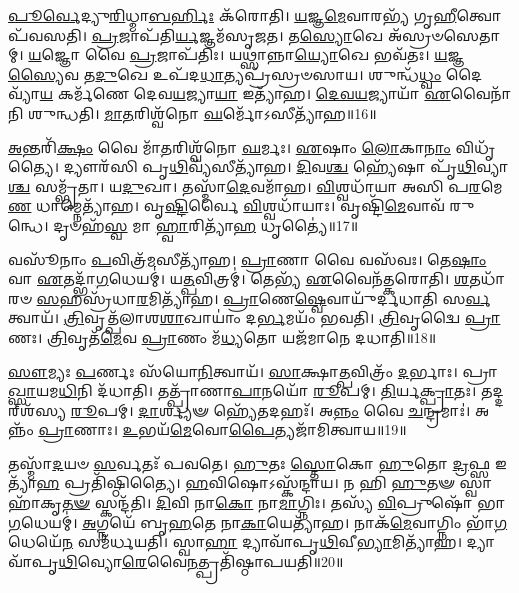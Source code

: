 \-\ul{𑌪𑍂}\-\-\ul{𑌰𑍍𑌵𑍇}\-𑌦𑍍𑌯𑍁\-\ul{𑌰𑌿}\-𑌧𑍍𑌮𑌾\-\ul{𑌬}\-\-\ul{𑌰𑍍}\-𑌹𑌿𑌃 𑌕᳴𑌰𑍋𑌤𑌿।
\-\ul{𑌯}\-𑌜𑍍𑌞\-\ul{𑌮𑍇}\-𑌵𑌾𑌰𑌭𑍍𑌯᳴ 𑌗𑍃\-\ul{𑌹𑍀}\-𑌤𑍍𑌵𑍋𑌪᳴𑌵𑌸𑌤𑌿।
\-\ul{𑌪𑍍𑌰}\-𑌜𑌾𑌪᳴𑌤𑌿\-\ul{𑌰𑍍𑌯}\-𑌜𑍍𑌞𑌮᳴\-𑌸𑍃𑌜𑌤।
𑌤\-\ul{𑌸𑍍𑌯𑍋}\-𑌖𑍇 𑌅᳴𑌸𑍍𑌰𑍞𑌸𑍇𑌤𑌾𑌮𑍍।
\-\ul{𑌯}\-𑌜𑍍𑌞𑍋 𑌵𑍈 \ul{𑌪𑍍𑌰}\-𑌜𑌾\-𑌪᳴𑌤𑌿𑌃।
𑌯𑌥𑍍𑌸𑌾॑𑌨𑍍𑌨𑌾\-\ul{𑌯𑍍𑌯𑍋}\-𑌖𑍇 𑌭𑌵᳴𑌤𑌃।
\-\ul{𑌯}\-𑌜𑍍𑌞\-\ul{𑌸𑍍𑌯𑍈}\-𑌵 𑌤\-\ul{𑌦𑍁}\-𑌖𑍇 𑌉𑌪᳴𑌦\-\ul{𑌧𑌾}\-𑌤𑍍𑌯𑌪𑍍𑌰᳴𑌸𑍍𑌰𑍞𑌸𑌾𑌯।
𑌶𑍁𑌨𑍍𑌧᳴\-\ul{𑌧𑍍𑌵𑌂} 𑌦𑍈𑌵𑍍𑌯𑌾᳴\-\ul{𑌯} 𑌕𑌰𑍍𑌮᳴𑌣𑍇 𑌦𑍇𑌵\-\ul{𑌯}\-𑌜𑍍𑌯𑌾\-\ul{𑌯𑌾} 𑌇𑌤𑍍𑌯𑌾᳴𑌹।
\-\ul{𑌦𑍇}\-\-\ul{𑌵}\-\-\ul{𑌯}\-𑌜𑍍𑌯𑌾𑌯𑌾᳴ \ul{𑌏}\-𑌵𑍈𑌨𑌾᳴𑌨𑌿 𑌶𑍁𑌨𑍍𑌧𑌤𑌿।
\-\ul{𑌮𑌾}\-\-\ul{𑌤}\-𑌰𑌿𑌶𑍍𑌵᳴𑌨𑍋 \ul{𑌘}\-𑌰𑍍𑌮𑍋᳴\-𑌽𑌸𑍀𑌤𑍍𑌯𑌾᳴𑌹॥16॥

\-\ul{𑌅}\-𑌨𑍍𑌤𑌰𑌿᳴\-\ul{𑌕𑍍𑌷𑌂} 𑌵𑍈 𑌮𑌾᳴\-\ul{𑌤}\-𑌰𑌿𑌶𑍍𑌵᳴𑌨𑍋 \ul{𑌘}\-𑌰𑍍𑌮𑌃।
\-\ul{𑌏}\-𑌷𑌾𑌂 \ul{𑌲𑍋}\-𑌕𑌾\-\ul{𑌨𑌾𑌂} 𑌵𑌿𑌧𑍃᳴𑌤𑍍𑌯𑍈।
𑌦𑍍𑌯𑍗𑌰᳴𑌸𑌿 𑌪𑍃\-\ul{𑌥𑌿}\-𑌵𑍍𑌯᳴𑌸𑍀𑌤𑍍𑌯𑌾᳴𑌹।
\-\ul{𑌦𑌿}\-𑌵\-\ul{𑌶𑍍𑌚} 𑌹𑍍𑌯𑍇᳴𑌷𑌾 𑌪𑍃᳴\-\ul{𑌥𑌿}\-𑌵𑍍𑌯𑌾\-\ul{𑌶𑍍𑌚} 𑌸𑌮𑍍𑌭𑍃᳴𑌤𑌾।
𑌯\-\ul{𑌦𑍁}\-𑌖𑌾।
𑌤𑌸𑍍𑌮𑌾᳴\-\ul{𑌦𑍇}\-𑌵𑌮𑌾᳴𑌹।
\-\ul{𑌵𑌿}\-𑌶𑍍𑌵𑌧𑌾᳴𑌯𑌾 𑌅𑌸𑌿 𑌪\-\ul{𑌰}\-𑌮𑍇\-\ul{𑌣} 𑌧𑌾𑌮𑍍𑌨𑍇𑌤𑍍𑌯𑌾᳴𑌹।
𑌵𑍃\-\ul{𑌷𑍍𑌟𑌿}\-𑌰𑍍𑌵𑍈 \ul{𑌵𑌿}\-𑌶𑍍𑌵𑌧𑌾᳴𑌯𑌾𑌃।
𑌵𑍃𑌷𑍍𑌟𑌿᳴\-\ul{𑌮𑍇}\-𑌵𑌾𑌵᳴ 𑌰𑍁𑌨𑍍𑌧𑍇।
𑌦𑍃𑍞𑌹᳴\-\ul{𑌸𑍍𑌵} 𑌮𑌾 \ul{𑌹𑍍𑌵𑌾}\-𑌰𑌿𑌤𑍍𑌯𑌾᳴\-\ul{𑌹} 𑌧𑍃𑌤𑍍𑌯𑍈॑॥17॥

𑌵𑌸𑍂᳴𑌨𑌾𑌂 \ul{𑌪}\-𑌵𑌿𑌤𑍍𑌰᳴\-\ul{𑌮}\-𑌸𑍀𑌤𑍍𑌯𑌾᳴𑌹।
\-\ul{𑌪𑍍𑌰𑌾}\-𑌣𑌾 𑌵𑍈 𑌵𑌸᳴𑌵𑌃।
𑌤𑍇\-\ul{𑌷𑌾𑌂} 𑌵𑌾 \ul{𑌏}\-𑌤𑌦𑍍𑌭𑌾᳴\-\ul{𑌗}\-𑌧𑍇𑌯𑌮𑍍॑।
𑌯\-\ul{𑌤𑍍𑌪}\-𑌵𑌿𑌤𑍍𑌰𑌮𑍍॑।
𑌤𑍇𑌭𑍍𑌯᳴ \ul{𑌏}\-𑌵𑍈𑌨᳴𑌤𑍍𑌕𑌰𑍋𑌤𑌿।
\-\ul{𑌶}\-𑌤𑌧𑌾᳴𑌰𑍞 \ul{𑌸}\-𑌹𑌸𑍍𑌰᳴𑌧𑌾\-\ul{𑌰}\-𑌮𑌿𑌤𑍍𑌯𑌾᳴𑌹।
\-\ul{𑌪𑍍𑌰𑌾}\-𑌣𑍇\-\ul{𑌷𑍍𑌵𑍇}\-𑌵𑌾𑌯𑍁᳴𑌰𑍍𑌦𑌧𑌾𑌤𑌿 𑌸\-\ul{𑌰𑍍𑌵}\-𑌤𑍍𑌵𑌾𑌯᳴।
\-\ul{𑌤𑍍𑌰𑌿}\-𑌵𑍃𑌤𑍍𑌪᳴𑌲𑌾𑌶\-\-\ul{𑌶𑌾}\-𑌖𑌾𑌯𑌾𑌂॑ 𑌦\-\ul{𑌰𑍍𑌭}\-𑌮𑌯𑌂᳴ 𑌭𑌵𑌤𑌿।
\-\ul{𑌤𑍍𑌰𑌿}\-𑌵𑍃𑌦𑍍𑌵𑍈 \ul{𑌪𑍍𑌰𑌾}\-𑌣𑌃।
\-\ul{𑌤𑍍𑌰𑌿}\-𑌵𑍃𑌤᳴\-\ul{𑌮𑍇}\-𑌵 \ul{𑌪𑍍𑌰𑌾}\-𑌣𑌂 𑌮᳴\-\ul{𑌧𑍍𑌯}\-𑌤𑍋 𑌯𑌜᳴𑌮𑌾𑌨𑍇 𑌦𑌧𑌾𑌤𑌿॥18॥

\-\ul{𑌸𑍗}\-𑌮𑍍𑌯𑌃 \ul{𑌪}\-𑌰𑍍𑌣𑌃 𑌸᳴𑌯𑍋\-\ul{𑌨𑌿}\-𑌤𑍍𑌵𑌾𑌯᳴।
\-\ul{𑌸𑌾}\-𑌕𑍍𑌷𑌾\-\ul{𑌤𑍍𑌪}\-𑌵𑌿𑌤𑍍𑌰𑌂᳴ \ul{𑌦}\-𑌰𑍍𑌭𑌾𑌃।
𑌪𑍍𑌰𑌾\-\ul{𑌖𑍍𑌸𑌾}\-𑌯𑌮\-\ul{𑌧𑌿}\-𑌨𑌿 𑌦᳴𑌧𑌾𑌤𑌿।
𑌤𑌤𑍍𑌪𑍍𑌰𑌾᳴𑌣𑌾\-\ul{𑌪𑌾}\-𑌨𑌯𑍋᳴ \ul{𑌰𑍂}\-𑌪𑌮𑍍।
\-\ul{𑌤𑌿}\-𑌰𑍍𑌯\-\ul{𑌕𑍍𑌪𑍍𑌰𑌾}\-𑌤𑌃।
𑌤𑌦𑍍𑌦𑌰𑍍‌𑌶᳴𑌸𑍍𑌯 \ul{𑌰𑍂}\-𑌪𑌮𑍍।
\-\ul{𑌦𑌾}\-𑌰𑍍𑌶𑍍𑌯𑍟 𑌹𑍍𑌯𑍇᳴𑌤𑌦𑌹𑌃᳴।
𑌅\-\ul{𑌨𑍍𑌨𑌂} 𑌵𑍈 \ul{𑌚}\-𑌨𑍍𑌦𑍍𑌰𑌮𑌾𑌃॑।
𑌅𑌨𑍍𑌨𑌂᳴ \ul{𑌪𑍍𑌰𑌾}\-𑌣𑌾𑌃।
\-\ul{𑌉}\-𑌭𑌯᳴\-\ul{𑌮𑍇}\-𑌵𑍋\-\ul{𑌪𑍈}\-𑌤𑍍𑌯𑌜𑌾᳴𑌮𑌿𑌤𑍍𑌵𑌾𑌯॥19॥

𑌤𑌸𑍍𑌮𑌾᳴\-\ul{𑌦}\-𑌯𑍞 \ul{𑌸}\-𑌰𑍍𑌵𑌤𑌃᳴ 𑌪𑌵𑌤𑍇।
\-\ul{𑌹𑍁}\-𑌤𑌃 \ul{𑌸𑍍𑌤𑍋}\-𑌕𑍋 \ul{𑌹𑍁}\-𑌤𑍋 \ul{𑌦𑍍𑌰}\-𑌫𑍍𑌸 𑌇𑌤𑍍𑌯𑌾᳴\-\ul{𑌹} 𑌪𑍍𑌰𑌤𑌿᳴\-𑌷𑍍𑌠𑌿𑌤𑍍𑌯𑍈।
\-\ul{𑌹}\-𑌵𑌿𑌷𑍋\-𑌽𑌸𑍍𑌕᳴𑌨𑍍𑌦𑌾𑌯।
𑌨 𑌹𑌿 \ul{𑌹𑍁}\-𑌤𑍟 𑌸𑍍𑌵𑌾𑌹𑌾᳴𑌕𑍃\-\ul{𑌤}\-\-\ul{𑍟} 𑌸𑍍𑌕𑌨𑍍𑌦᳴𑌤𑌿।
\-\ul{𑌦𑌿}\-𑌵𑌿 𑌨𑌾\-\ul{𑌕𑍋} 𑌨𑌾\-\ul{𑌮𑌾}\-𑌗𑍍𑌨𑌿𑌃।
𑌤𑌸𑍍𑌯᳴ \ul{𑌵𑌿}\-𑌪𑍍𑌰𑍁𑌷𑍋᳴ 𑌭𑌾\-\ul{𑌗}\-𑌧𑍇𑌯𑌮𑍍॑।
\-\ul{𑌅}\-𑌗𑍍𑌨𑌯𑍇᳴ 𑌬𑍃\-\ul{𑌹}\-𑌤𑍇 𑌨𑌾\-\ul{𑌕𑌾}\-𑌯𑍇𑌤𑍍𑌯𑌾᳴𑌹।
𑌨𑌾𑌕᳴\-\ul{𑌮𑍇}\-𑌵𑌾𑌗𑍍𑌨𑌿𑌂 𑌭𑌾᳴\-\ul{𑌗}\-𑌧𑍇𑌯𑍇᳴\-\ul{𑌨} 𑌸𑌮᳴𑌰𑍍𑌧𑌯𑌤𑌿।
𑌸𑍍𑌵𑌾\-\ul{𑌹𑌾} 𑌦𑍍𑌯𑌾𑌵𑌾᳴𑌪𑍃\-\ul{𑌥𑌿}\-𑌵𑍀\-\ul{𑌭𑍍𑌯𑌾}\-𑌮𑌿𑌤𑍍𑌯𑌾᳴𑌹।
𑌦𑍍𑌯𑌾𑌵𑌾᳴𑌪𑍃\-\ul{𑌥𑌿}\-𑌵𑍍𑌯𑍋\-\ul{𑌰𑍇}\-𑌵𑍈\-\ul{𑌨}\-𑌤𑍍𑌪𑍍𑌰𑌤𑌿᳴\-𑌷𑍍𑌠𑌾𑌪𑌯𑌤𑌿॥20॥

